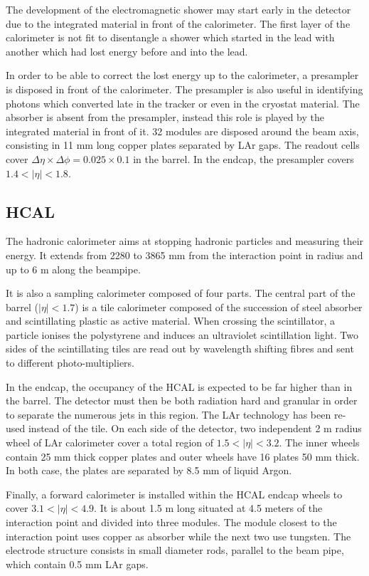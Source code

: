The development of the electromagnetic shower may start early in the detector due to the integrated material in front of the calorimeter.
The first layer of the calorimeter is not fit to disentangle a shower which started in the lead with another which had lost energy before and into the lead.

In order to be able to correct the lost energy up to the calorimeter, a presampler is disposed in front of the calorimeter.
The presampler is also useful in identifying photons which converted late in the tracker or even in the cryostat material.
The absorber is absent from the presampler, instead this role is played by the integrated material in front of it.
32 modules are disposed around the beam axis, consisting in 11 mm long copper plates separated by LAr gaps.
The readout cells cover $\Delta\eta\times\Delta\phi=0.025\times0.1$ in the barrel.
In the endcap, the presampler covers $1.4<|\eta|<1.8$.

\subsection{HCAL}
\label{sec:orgeacc015}

The hadronic calorimeter aims at stopping hadronic particles and measuring their energy.
It extends from 2280 to 3865 mm from the interaction point in radius and up to 6 m along the beampipe.

It is also a sampling calorimeter composed of four parts.
The central part of the barrel ($|\eta|<1.7$) is a tile calorimeter composed of the succession of steel absorber and scintillating plastic as active material.
When crossing the scintillator, a particle  ionises the polystyrene and induces an ultraviolet scintillation light.
Two sides of the scintillating tiles are read out by wavelength shifting fibres and sent to different photo-multipliers.

In the endcap, the occupancy of the HCAL is expected to be far higher than in the barrel.
The detector must then be both radiation hard and granular in order to separate the numerous jets in this region.
The LAr technology has been re-used instead of the tile.
On each side of the detector, two independent 2 m radius wheel of LAr calorimeter cover a total region of $1.5<|\eta|<3.2$.
The inner wheels contain 25 mm thick copper plates and outer wheels have 16 plates 50 mm thick.
In both case, the plates are separated by 8.5 mm of liquid Argon.

Finally, a forward calorimeter is installed within the HCAL endcap wheels to cover $3.1<|\eta|<4.9$.
It is about 1.5 m long situated at 4.5 meters of the interaction point and divided into three modules.
The module closest to the interaction point uses copper as absorber while the next two use tungsten.
The electrode structure consists in small diameter rods, parallel to the beam pipe, which contain 0.5 mm LAr gaps.

